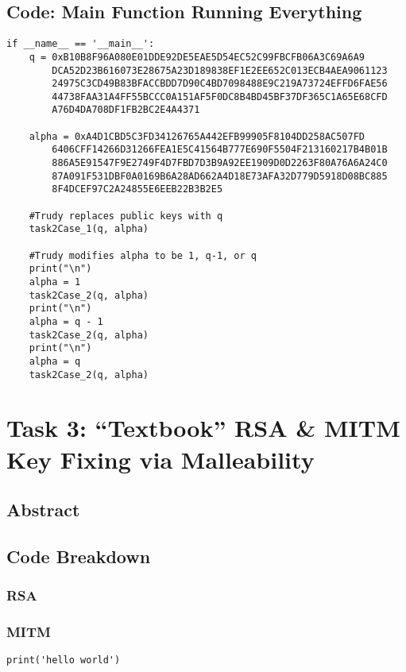 \documentclass[11pt]{article}
\begin{document}
\subsection*{Code: Main Function Running Everything}

\begin{lstlisting}
if __name__ == '__main__':
    q = 0xB10B8F96A080E01DDE92DE5EAE5D54EC52C99FBCFB06A3C69A6A9
		DCA52D23B616073E28675A23D189838EF1E2EE652C013ECB4AEA9061123
		24975C3CD49B83BFACCBDD7D90C4BD7098488E9C219A73724EFFD6FAE56
		44738FAA31A4FF55BCCC0A151AF5F0DC8B4BD45BF37DF365C1A65E68CFD
		A76D4DA708DF1FB2BC2E4A4371

    alpha = 0xA4D1CBD5C3FD34126765A442EFB99905F8104DD258AC507FD
		6406CFF14266D31266FEA1E5C41564B777E690F5504F213160217B4B01B
		886A5E91547F9E2749F4D7FBD7D3B9A92EE1909D0D2263F80A76A6A24C0
		87A091F531DBF0A0169B6A28AD662A4D18E73AFA32D779D5918D08BC885
		8F4DCEF97C2A24855E6EEB22B3B2E5

    #Trudy replaces public keys with q
    task2Case_1(q, alpha)

    #Trudy modifies alpha to be 1, q-1, or q
    print("\n")
    alpha = 1
    task2Case_2(q, alpha)
    print("\n")
    alpha = q - 1
    task2Case_2(q, alpha)
    print("\n")
    alpha = q   
    task2Case_2(q, alpha)
\end{lstlisting}


\section*{Task 3: ``Textbook'' RSA \& MITM Key Fixing via Malleability}
\subsection*{Abstract}

\subsection*{Code Breakdown}
\subsubsection*{RSA}
\subsubsection*{MITM}

\begin{lstlisting}
print('hello world')
\end{lstlisting}
\end{document}
